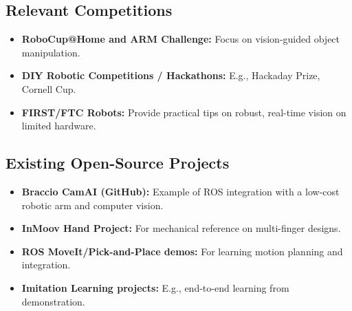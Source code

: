 \documentclass[document]{llncs}
\begin{document}
\subsection{Relevant Competitions}
\begin{itemize}
  \item \textbf{RoboCup@Home and ARM Challenge:} Focus on vision-guided object manipulation.
  \item \textbf{DIY Robotic Competitions / Hackathons:} E.g., Hackaday Prize, Cornell Cup.
  \item \textbf{FIRST/FTC Robots:} Provide practical tips on robust, real-time vision on limited hardware.
\end{itemize}

\subsection{Existing Open-Source Projects}
\begin{itemize}
  \item \textbf{Braccio CamAI (GitHub):} Example of ROS integration with a low-cost robotic arm and computer vision.
  \item \textbf{InMoov Hand Project:} For mechanical reference on multi-finger designs.
  \item \textbf{ROS MoveIt/Pick-and-Place demos:} For learning motion planning and integration.
  \item \textbf{Imitation Learning projects:} E.g., end-to-end learning from demonstration.
\end{itemize}
\end{document}
